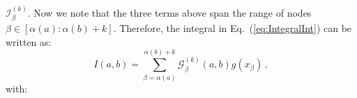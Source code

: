 \documentclass[10pt,a4paper]{article}
\begin{document}
$\mathcal{I}_\beta^{(k)}$. Now we note that the three terms above span
the range of nodes $\beta\in[\alpha(a):\alpha(b)+k]$. Therefore, the
integral in Eq.~(\ref{eq:IntegralInt}) can be written as:
\begin{equation}\label{eq:integralT0}
  I(a,b) =
  \sum_{\beta=\alpha(a)}^{\alpha(b)+k}\mathcal{G}_\beta^{(k)}(a,b) g(x_{\beta})\,,
\end{equation}
with:


\end{document}
